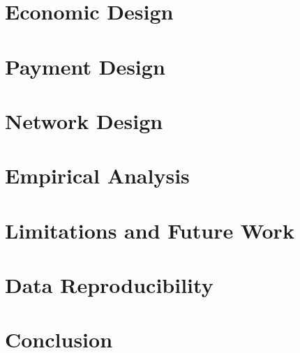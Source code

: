 \documentclass[anonymous]{IEEEtran}
\begin{document}
\section{Economic Design}
\label{sec:economic}


\section{Payment Design}
\label{sec:payment}


\section{Network Design}
\label{sec:network}


\section{Empirical Analysis}
\label{sec:analysis}


\section{Limitations and Future Work}
\label{sec:limitations_futurework}


\section{Data Reproducibility}
\label{sec:code}


\section{Conclusion}
\label{sec:conclusion}






\appendix[Algorithms]
\label{sec:algorithms}


\label{sec:proof}


\appendix[Scheduling]
\label{sec:scheduling}

\end{document}
